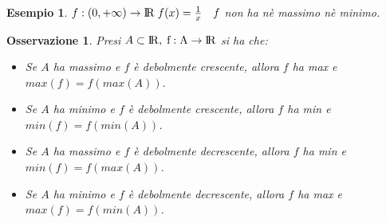 \documentclass[12pt, a4paper]{article}
\theoremstyle{break}
\newtheorem{example}{Esempio}[subsection]
\newtheorem{observation}{Osservazione}[subsection]
\newcommand\R{{\rm I\!R}}
\begin{document}
    \begin{example}
        $f:(0,+\infty)\rightarrow\R\; f(x) = \frac{1}{x}\quad f$ non ha nè massimo nè minimo.
    \end{example}
    \begin{figure}[!htb]
        \centering
    \end{figure}
    \newpage
    \begin{observation}
        Presi $A\subset{}\rm I\!R,\; f:A\rightarrow\R$ si ha che:
        \begin{itemize}
            \item Se $A$ ha massimo e $f$ è debolmente crescente, allora $f$ ha max e $max(f) = f(max(A))$.
            \item Se $A$ ha minimo e $f$ è debolmente crescente, allora $f$ ha min e $min(f) = f(min(A))$.
            \item Se $A$ ha massimo e $f$ è debolmente decrescente, allora $f$ ha min e $min(f) = f(max(A))$.
            \item Se $A$ ha minimo e $f$ è debolmente decrescente, allora $f$ ha max e $max(f) = f(min(A))$.
        \end{itemize}
    \end{observation}
\end{document}
